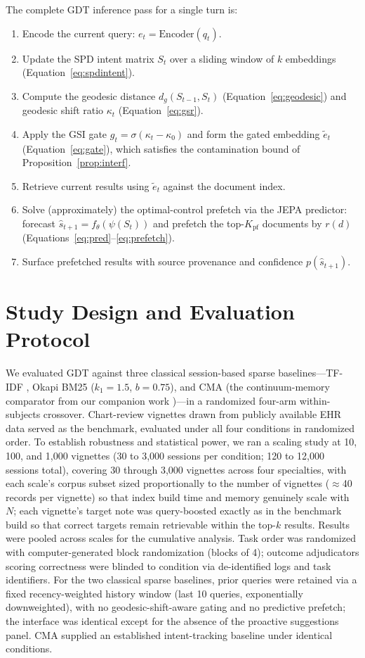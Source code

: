 \documentclass[11pt]{article}
\begin{document}
The complete GDT inference pass for a single turn is:
\begin{enumerate}
  \item Encode the current query: $e_t = \mathrm{Encoder}(q_t)$.
  \item Update the SPD intent matrix $S_t$ over a sliding window of $k$ embeddings (Equation~\ref{eq:spdintent}).
  \item Compute the geodesic distance $d_g(S_{t-1},S_t)$ (Equation~\ref{eq:geodesic}) and geodesic shift ratio $\kappa_t$ (Equation~\ref{eq:gsr}).
  \item Apply the GSI gate $g_t=\sigma(\kappa_t-\kappa_0)$ and form the gated embedding $\tilde{e}_t$ (Equation~\ref{eq:gate}), which satisfies the contamination bound of Proposition~\ref{prop:interf}.
  \item Retrieve current results using $\tilde{e}_t$ against the document index.
  \item Solve (approximately) the optimal-control prefetch via the JEPA predictor: forecast $\hat{s}_{t+1}=f_\theta(\psi(S_t))$ and prefetch the top-$K_{\mathrm{pf}}$ documents by $r(d)$ (Equations~\ref{eq:pred}--\ref{eq:prefetch}).
  \item Surface prefetched results with source provenance and confidence $p(\hat{s}_{t+1})$.
\end{enumerate}

\section{Study Design and Evaluation Protocol}
\label{sec:design}

We evaluated GDT against three classical session-based sparse baselines---TF-IDF \citep{salton83}, Okapi BM25 \citep{robertson1995,robertson1976} ($k_1=1.5$, $b=0.75$), and CMA (the continuum-memory comparator from our companion work \citep{cma2026})---in a randomized four-arm within-subjects crossover. Chart-review vignettes drawn from publicly available EHR data served as the benchmark, evaluated under all four conditions in randomized order. To establish robustness and statistical power, we ran a scaling study at 10, 100, and 1{,}000 vignettes (30 to 3{,}000 sessions per condition; 120 to 12{,}000 sessions total), covering 30 through 3{,}000 vignettes across four specialties, with each scale's corpus subset sized proportionally to the number of vignettes ($\approx$40 records per vignette) so that index build time and memory genuinely scale with $N$; each vignette's target note was query-boosted exactly as in the benchmark build so that correct targets remain retrievable within the top-$k$ results. Results were pooled across scales for the cumulative analysis. Task order was randomized with computer-generated block randomization (blocks of 4); outcome adjudicators scoring correctness were blinded to condition via de-identified logs and task identifiers. For the two classical sparse baselines, prior queries were retained via a fixed recency-weighted history window (last 10 queries, exponentially downweighted), with no geodesic-shift-aware gating and no predictive prefetch; the interface was identical except for the absence of the proactive suggestions panel. CMA supplied an established intent-tracking baseline under identical conditions.
\end{document}
